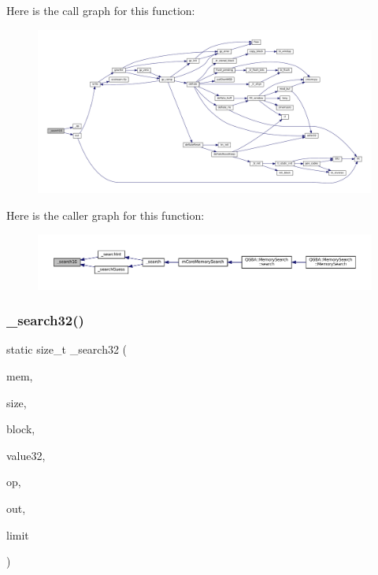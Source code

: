 Here is the call graph for this function\+:
\nopagebreak
\begin{figure}[H]
\begin{center}
\leavevmode
\includegraphics[width=350pt]{mem-search_8c_aa1dc9e477a1b7df5ce90e5bae240e763_cgraph}
\end{center}
\end{figure}
Here is the caller graph for this function\+:
\nopagebreak
\begin{figure}[H]
\begin{center}
\leavevmode
\includegraphics[width=350pt]{mem-search_8c_aa1dc9e477a1b7df5ce90e5bae240e763_icgraph}
\end{center}
\end{figure}
\mbox{\label{mem-search_8c_aef1a36a86840034ac9b64b277a9c78b8}} 
\subsubsection{\texorpdfstring{\+\_\+search32()}{\_search32()}}
{\footnotesize\ttfamily static size\+\_\+t \+\_\+search32 (\begin{DoxyParamCaption}\item[{const void $\ast$}]{mem,  }\item[{size\+\_\+t}]{size,  }\item[{const struct m\+Core\+Memory\+Block $\ast$}]{block,  }\item[{uint32\+\_\+t}]{value32,  }\item[{enum m\+Core\+Memory\+Search\+Op}]{op,  }\item[{struct m\+Core\+Memory\+Search\+Results $\ast$}]{out,  }\item[{size\+\_\+t}]{limit }\end{DoxyParamCaption})\hspace{0.3cm}{\ttfamily [static]}}

